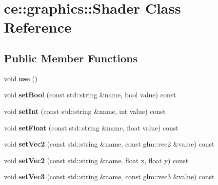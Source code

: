 \hypertarget{classce_1_1graphics_1_1_shader}{}\section{ce\+:\+:graphics\+:\+:Shader Class Reference}
\label{classce_1_1graphics_1_1_shader}
\subsection*{Public Member Functions}
\begin{DoxyCompactItemize}
\item 
\mbox{\label{classce_1_1graphics_1_1_shader_aca7fefcc416d17e11cf5af7fb36148de}} 
void {\bfseries use} ()
\item 
\mbox{\label{classce_1_1graphics_1_1_shader_a42b65349e86147bbd0fc611eeb4f5890}} 
void {\bfseries set\+Bool} (const std\+::string \&name, bool value) const
\item 
\mbox{\label{classce_1_1graphics_1_1_shader_ab0599b30f759cd140b3c1727673c4665}} 
void {\bfseries set\+Int} (const std\+::string \&name, int value) const
\item 
\mbox{\label{classce_1_1graphics_1_1_shader_a31d56ffb50a079444baf27c863023efc}} 
void {\bfseries set\+Float} (const std\+::string \&name, float value) const
\item 
\mbox{\label{classce_1_1graphics_1_1_shader_a14c07171e23106041bb1dbb683a19d2f}} 
void {\bfseries set\+Vec2} (const std\+::string \&name, const glm\+::vec2 \&value) const
\item 
\mbox{\label{classce_1_1graphics_1_1_shader_aba50173108bd30bcf6f1a4a0446d6a09}} 
void {\bfseries set\+Vec2} (const std\+::string \&name, float x, float y) const
\item 
\mbox{\label{classce_1_1graphics_1_1_shader_ad2ed1ba06e20251009c869e4344605ef}} 
void {\bfseries set\+Vec3} (const std\+::string \&name, const glm\+::vec3 \&value) const
\item 

\end{DoxyCompactItemize}
